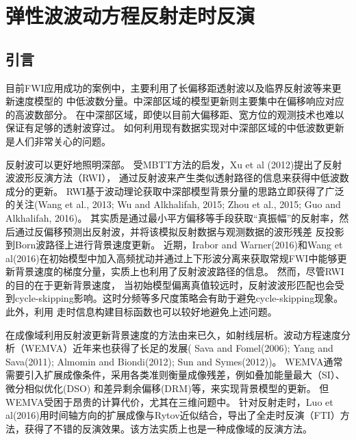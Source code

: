 \chapter{弹性波波动方程反射走时反演}

\section{引言}
目前FWI应用成功的案例中，主要利用了长偏移距透射波以及临界反射波等来更新速度模型的
中低波数分量。中深部区域的模型更新则主要集中在偏移响应对应的高波数部分。
在中深部区域，即使以目前大偏移距、宽方位的观测技术也难以保证有足够的透射波穿过。
如何利用现有数据实现对中深部区域的中低波数更新是人们非常关心的问题。

反射波可以更好地照明深部。
受MBTT方法的启发，Xu et al
(2012)\cite{xu:2012}提出了反射波波形反演方法（RWI），
通过反射波来产生类似透射路径的信息来获得中低波数成分的更新。
RWI基于波动理论获取中深部模型背景分量的思路立即获得了广泛的关注(Wang et al., 2013\cite{Wang2013}; Wu and Alkhalifah, 2015; 
Zhou et al., 2015\cite{zhou:2015}; Guo and Alkhalifah, 2016\cite{Guo2016})。
其实质是通过最小平方偏移等手段获取“真振幅”的反射率，然后通过反偏移预测出反射波，并将该模拟反射数据与观测数据的波形残差
反投影到Born波路径上进行背景速度更新。
近期，Irabor and
Warner(2016)\cite{Irabor2016}和Wang et
al(2016)\cite{WangFangEtAl2016}在初始模型中加入高频扰动并通过上下形波分离来获取常规FWI中能够更新背景速度的梯度分量，实质上也利用了反射波波路径的信息。
然而，尽管RWI的目的在于更新背景速度，
当初始模型偏离真值较远时，反射波波形匹配也会受到cycle-skipping影响。这时分频等多尺度策略会有助于避免cycle-skipping现象\cite{Wang2013}。此外，利用
走时信息构建目标函数也可以较好地避免上述问题。

在成像域利用反射波更新背景速度的方法由来已久，如射线层析\cite{Stork1992}。波动方程速度分析（WEMVA）近年来也获得了长足的发展(
Sava and
Fomel(2006)\cite{SavaEtAl2006}; Yang and Sava(2011)\cite{YangEtAl2011}; Almomin and
Biondi(2012)\cite{Almomin2012}; Sun and Symes(2012)\cite{SunEtAl2012})。
WEMVA通常需要引入扩展成像条件，采用各类准则衡量成像残差，例如叠加能量最大（SI）\cite{ChaventEtAl1995}、微分相似优化(DSO)\cite{SymesEtAl1991}
和差异剩余偏移(DRM)\cite{SavaEtAl2004}等，来实现背景模型的更新。
但WEMVA受困于昂贵的计算代价，尤其在三维问题中。
针对反射走时，Luo et
al(2016)\cite{Luo2016}用时间轴方向的扩展成像与Rytov近似结合，导出了全走时反演（FTI）方法，获得了不错的反演效果。该方法实质上也是一种成像域的反演方法。

